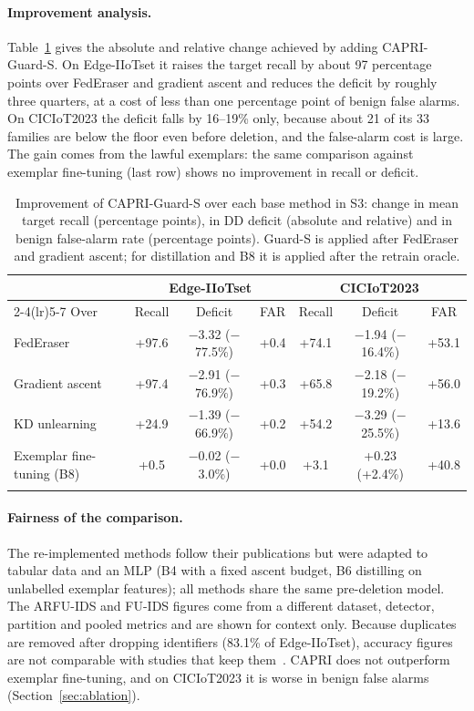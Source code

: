 \documentclass[pdflatex,sn-mathphys-num,iicol]{sn-jnl}
\begin{document}
\paragraph{Improvement analysis.} Table~\ref{tab:improve} gives the absolute and relative change achieved by adding CAPRI-Guard-S. On Edge-IIoTset it raises the target recall by about 97 percentage points over FedEraser and gradient ascent and reduces the deficit by roughly three quarters, at a cost of less than one percentage point of benign false alarms. On CICIoT2023 the deficit falls by 16--19\% only, because about 21 of its 33 families are below the floor even before deletion, and the false-alarm cost is large. The gain comes from the lawful exemplars: the same comparison against exemplar fine-tuning (last row) shows no improvement in recall or deficit.

\begin{table}[t]
\caption{Improvement of CAPRI-Guard-S over each base method in S3: change in mean target recall (percentage points), in DD deficit (absolute and relative) and in benign false-alarm rate (percentage points). Guard-S is applied after FedEraser and gradient ascent; for distillation and B8 it is applied after the retrain oracle.}\label{tab:improve}
\scriptsize
\setlength{\tabcolsep}{2.5pt}
\begin{tabular*}{\textwidth}{@{\extracolsep\fill}lcccccc}
\toprule
 & \multicolumn{3}{c}{Edge-IIoTset} & \multicolumn{3}{c}{CICIoT2023} \\
\cmidrule(lr){2-4}\cmidrule(lr){5-7}
Over & Recall & Deficit & FAR & Recall & Deficit & FAR \\
\midrule
FedEraser~\cite{liu2021federaser} & +97.6 & $-$3.32 ($-$77.5\%) & +0.4 & +74.1 & $-$1.94 ($-$16.4\%) & +53.1 \\
Gradient ascent~\cite{halimi2022} & +97.4 & $-$2.91 ($-$76.9\%) & +0.3 & +65.8 & $-$2.18 ($-$19.2\%) & +56.0 \\
KD unlearning~\cite{wu2022distill} & +24.9 & $-$1.39 ($-$66.9\%) & +0.2 & +54.2 & $-$3.29 ($-$25.5\%) & +13.6 \\
Exemplar fine-tuning (B8) & +0.5 & $-$0.02 ($-$3.0\%) & +0.0 & +3.1 & +0.23 (+2.4\%) & +40.8 \\
\botrule
\end{tabular*}
\end{table}

\paragraph{Fairness of the comparison.} The re-implemented methods follow their publications but were adapted to tabular data and an MLP (B4 with a fixed ascent budget, B6 distilling on unlabelled exemplar features); all methods share the same pre-deletion model. The ARFU-IDS and FU-IDS figures come from a different dataset, detector, partition and pooled metrics and are shown for context only. Because duplicates are removed after dropping identifiers (83.1\% of Edge-IIoTset), accuracy figures are not comparable with studies that keep them~\cite{bilal2026,peng2025fdids}. CAPRI does not outperform exemplar fine-tuning, and on CICIoT2023 it is worse in benign false alarms (Section~\ref{sec:ablation}).
\end{document}
